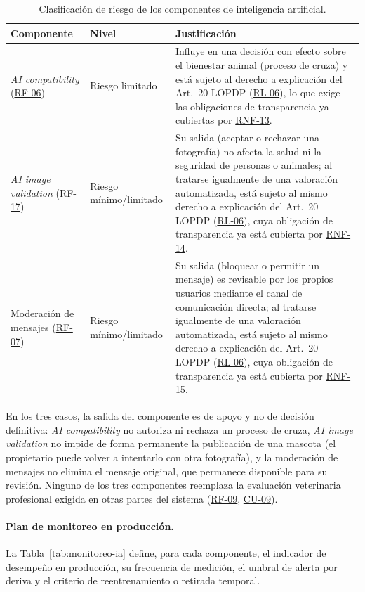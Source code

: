 \documentclass[journal,onecolumn]{IEEEtran}
\begin{document}
\begin{table}[H]
	\centering
	\caption{Clasificación de riesgo de los componentes de inteligencia artificial.}
	\label{tab:riesgo-ia}
	\small
	\begin{tabularx}{\textwidth}{@{}p{2.3cm} p{2.0cm} X@{}}
		\toprule
		\textbf{Componente} & \textbf{Nivel} & \textbf{Justificación} \\
		\midrule
		\emph{AI compatibility} (\hyperref[tab:RF-06]{RF-06}) & Riesgo limitado & Influye en una decisión con efecto sobre el bienestar animal (proceso de cruza) y está sujeto al derecho a explicación del Art.~20 LOPDP (\hyperref[rl:06]{RL-06}), lo que exige las obligaciones de transparencia ya cubiertas por \hyperref[tab:RNF-13]{RNF-13}. \\
		\addlinespace
		\emph{AI image validation} (\hyperref[tab:RF-17]{RF-17}) & Riesgo mínimo/limitado & Su salida (aceptar o rechazar una fotografía) no afecta la salud ni la seguridad de personas o animales; al tratarse igualmente de una valoración automatizada, está sujeto al mismo derecho a explicación del Art.~20 LOPDP (\hyperref[rl:06]{RL-06}), cuya obligación de transparencia ya está cubierta por \hyperref[tab:RNF-14]{RNF-14}. \\
		\addlinespace
		Moderación de mensajes (\hyperref[tab:RF-07]{RF-07}) & Riesgo mínimo/limitado & Su salida (bloquear o permitir un mensaje) es revisable por los propios usuarios mediante el canal de comunicación directa; al tratarse igualmente de una valoración automatizada, está sujeto al mismo derecho a explicación del Art.~20 LOPDP (\hyperref[rl:06]{RL-06}), cuya obligación de transparencia ya está cubierta por \hyperref[tab:RNF-15]{RNF-15}. \\
		\bottomrule
	\end{tabularx}
\end{table}

En los tres casos, la salida del componente es de apoyo y no de decisión
definitiva: \emph{AI compatibility} no autoriza ni rechaza un proceso de
cruza, \emph{AI image validation} no impide de forma permanente la
publicación de una mascota (el propietario puede volver a intentarlo con
otra fotografía), y la moderación de mensajes no elimina el mensaje
original, que permanece disponible para su revisión. Ninguno de los tres
componentes reemplaza la evaluación veterinaria profesional exigida en
otras partes del sistema (\hyperref[tab:RF-09]{RF-09}, \hyperref[tab:CU-09]{CU-09}).

\paragraph{Plan de monitoreo en producción.}
La Tabla~\ref{tab:monitoreo-ia} define, para cada componente, el
indicador de desempeño en producción, su frecuencia de medición, el
umbral de alerta por deriva y el criterio de reentrenamiento o retirada
temporal.
\end{document}

